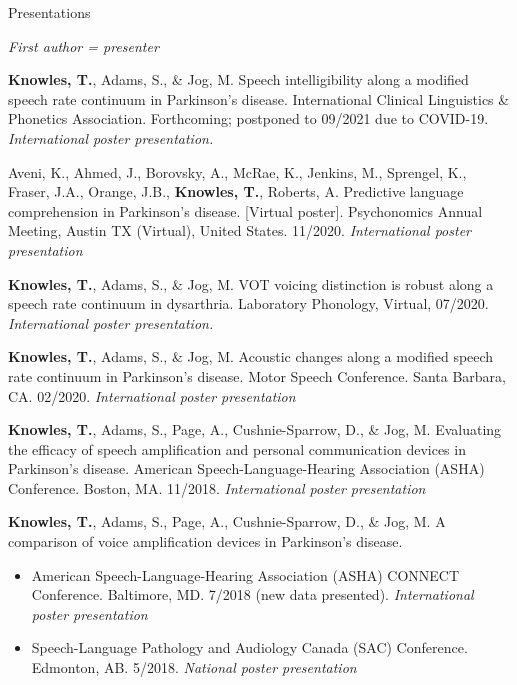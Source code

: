 \documentclass{resume} %
\begin{document}
\begin{rSection}{Presentations}
\begin{center}
	\emph{First author = presenter}
\end{center}

\begin{etaremune}

\item {\bf Knowles, T.}, Adams, S., \& Jog, M. Speech intelligibility along a modified speech rate continuum in Parkinson's disease. International Clinical Linguistics \& Phonetics Association. Forthcoming; postponed to 09/2021 due to COVID-19.  \emph{International poster presentation.}

\item Aveni, K., Ahmed, J., Borovsky, A., McRae, K., Jenkins, M., Sprengel, K., Fraser, J.A., Orange, J.B., {\bf Knowles, T.}, Roberts, A. Predictive language comprehension in Parkinson’s disease. [Virtual poster]. Psychonomics Annual Meeting, Austin TX (Virtual), United States. 11/2020. \emph{International poster presentation}

\item  {\bf Knowles, T.}, Adams, S., \& Jog, M. VOT voicing distinction is robust along a speech rate continuum in dysarthria. Laboratory Phonology, Virtual, 07/2020.  \emph{International poster presentation.}
   
\item {\bf Knowles, T.}, Adams, S., \& Jog, M. Acoustic changes along a modified speech rate continuum in Parkinson's disease. Motor Speech Conference. Santa Barbara, CA. 02/2020. \emph{International poster presentation}

\item {\bf Knowles, T.}, Adams, S., Page, A., Cushnie-Sparrow, D., \& Jog, M. Evaluating the efficacy of speech amplification and personal communication devices in Parkinson's disease. American Speech-Language-Hearing Association (ASHA) Conference. Boston, MA. 11/2018. \emph{International poster presentation}
	
\item {\bf Knowles, T.}, Adams, S., Page, A., Cushnie-Sparrow, D., \& Jog, M. A comparison of voice amplification devices in Parkinson's disease. 
		\begin{itemize}
			\renewcommand\labelitemi{$\cdot$}
			\item American Speech-Language-Hearing Association (ASHA) CONNECT Conference. Baltimore, MD. 7/2018 (new data presented). \emph{International poster presentation}
			\item Speech-Language Pathology and Audiology Canada (SAC) Conference. Edmonton, AB. 5/2018. \emph{National poster presentation}
		\end{itemize}
	

\end{etaremune}
\end{rSection}
\end{document}
